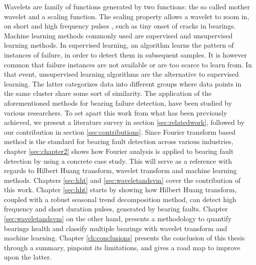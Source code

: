 \documentclass[../Main/thesis.tex]{subfiles}
\begin{document}
Wavelets are family of functions generated by two functions: the so called mother wavelet and a scaling function. The scaling property allows a wavelet to zoom in, on short and high frequency pulses \cite{albert09},
such as tiny onset of cracks in bearings.
\justify
Machine learning methods commonly used are supervised and unsupervised learning methods. In supervised learning, an algorithm learns the pattern of instances of failure, in order to detect them in subsequent samples. It is however common that failure instances are not available or are too scarce to learn from. In that event, unsupervised learning algorithms are the alternative to supervised learning. The latter categorizes data into different groups where data points in the same cluster share some sort of similarity.
\justify
 The application of the aforementioned methods for bearing failure detection, have been studied by various researchers. 
To set apart this work from what has been previously achieved, we present a literature survey in section \ref{sec:relatedwork}, followed by our contribution in section \ref{sec:contributions}. Since Fourier transform based method is the standard for bearing fault detection across various industries, chapter \ref{sec:chapter2} shows how Fourier analysis is applied to bearing fault detection by using a concrete case study. This will serve as a reference with regards to Hilbert Huang transform, wavelet transform and machine learning methods.
\justify
Chapters \ref{sec:hht} and \ref{sec:waveletandsvm} cover the contribution of this work. Chapter \ref{sec:hht} starts by showing how Hilbert Huang transform, coupled with a robust seasonal trend decomposition method, can detect high frequency and short duration pulses, generated by bearing faults. Chapter \ref{sec:waveletandsvm} on the other hand, presents a methodology to quantify bearings health and classify multiple bearings with wavelet transform and machine learning. Chapter \ref{ch:conclusions} presents the conclusion of this thesis through a summary, pinpoint its limitations, and gives a road map to improve upon the latter.

\clearpage
\end{document}
